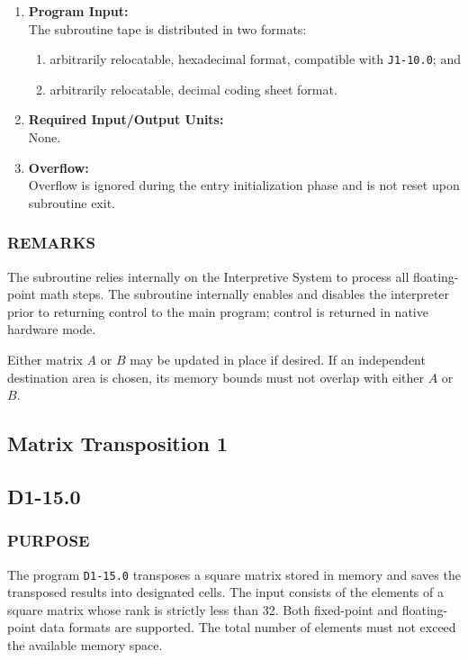 \documentclass{article}
\begin{document}
\begin{enumerate}[leftmargin=1.5em, itemsep=6pt]
    \item \textbf{Program Input:} \\
    The subroutine tape is distributed in two formats:
    \begin{enumerate}[label=\alph*), itemsep=2pt, topsep=2pt]
        \item arbitrarily relocatable, hexadecimal format, compatible with \texttt{J1-10.0}; and
        \item arbitrarily relocatable, decimal coding sheet format.
    \end{enumerate}
    
    \item \textbf{Required Input/Output Units:} \\
    None.
    
    \item \textbf{Overflow:} \\
    Overflow is ignored during the entry initialization phase and is not reset upon subroutine exit.
\end{enumerate}

\subsubsection*{REMARKS}
The subroutine relies internally on the Interpretive System to process all floating-point math steps. The subroutine internally enables and disables the interpreter prior to returning control to the main program; control is returned in native hardware mode.

Either matrix $A$ or $B$ may be updated in place if desired. If an independent destination area is chosen, its memory bounds must not overlap with either $A$ or $B$.
\newpage

\subsection{Matrix Transposition 1}
\label{subsec:matrix_transposition_1}

\subsection*{D1-15.0}

\subsubsection*{PURPOSE}
The program \texttt{D1-15.0} transposes a square matrix stored in memory and saves the transposed results into designated cells. The input consists of the elements of a square matrix whose rank is strictly less than 32. Both fixed-point and floating-point data formats are supported. The total number of elements must not exceed the available memory space.
\end{document}
